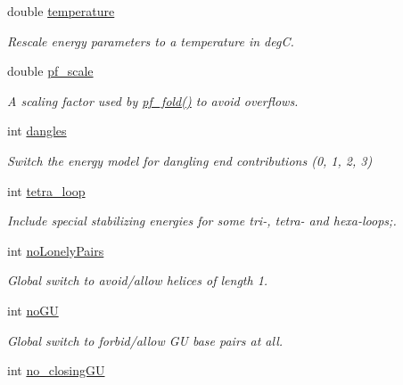 \begin{DoxyCompactItemize}
\item 
double \hyperlink{group__model__details_gab4b11c8d9c758430960896bc3fe82ead}{temperature}
\begin{DoxyCompactList}\small\item\em Rescale energy parameters to a temperature in deg\-C. \end{DoxyCompactList}\item 
double \hyperlink{group__model__details_gad3b22044065acc6dee0af68931b52cfd}{pf\-\_\-scale}
\begin{DoxyCompactList}\small\item\em A scaling factor used by \hyperlink{group__pf__fold_gadc3db3d98742427e7001a7fd36ef28c2}{pf\-\_\-fold()} to avoid overflows. \end{DoxyCompactList}\item 
int \hyperlink{group__model__details_ga72b511ed1201f7e23ec437e468790d74}{dangles}
\begin{DoxyCompactList}\small\item\em Switch the energy model for dangling end contributions (0, 1, 2, 3) \end{DoxyCompactList}\item 
int \hyperlink{group__model__details_ga4f6265bdf0ead7ff4628a360adbfd77e}{tetra\-\_\-loop}
\begin{DoxyCompactList}\small\item\em Include special stabilizing energies for some tri-\/, tetra-\/ and hexa-\/loops;. \end{DoxyCompactList}\item 
int \hyperlink{group__model__details_ga097eccaabd6ae8b4fef83cccff85bb5d}{no\-Lonely\-Pairs}
\begin{DoxyCompactList}\small\item\em Global switch to avoid/allow helices of length 1. \end{DoxyCompactList}\item 
\hypertarget{group__model__details_gabf380d09e4f1ab94fc6af57cf0ad5d32}{int \hyperlink{group__model__details_gabf380d09e4f1ab94fc6af57cf0ad5d32}{no\-G\-U}}\label{group__model__details_gabf380d09e4f1ab94fc6af57cf0ad5d32}

\begin{DoxyCompactList}\small\item\em Global switch to forbid/allow G\-U base pairs at all. \end{DoxyCompactList}\item 
\hypertarget{group__model__details_gaa8d1c7b92489179e1eafa562b7bdd259}{int \hyperlink{group__model__details_gaa8d1c7b92489179e1eafa562b7bdd259}{no\-\_\-closing\-G\-U}}\label{group__model__details_gaa8d1c7b92489179e1eafa562b7bdd259}


\end{DoxyCompactItemize}
